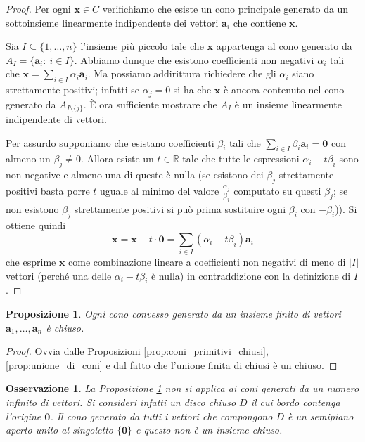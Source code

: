 \documentclass[italian, 12pt, reqno]{article}
\theoremstyle{myteo}
\newtheorem{proposition}[theorem]{Proposizione}
\newtheorem{remark}[theorem]{Osservazione}
\numberwithin{equation}{section}
\begin{document}
\begin{proof}
  Per ogni \(\mathbf{x}\in C\) verifichiamo che esiste un cono principale generato da un sottoinsieme linearmente indipendente dei vettori \(\mathbf{a}_i\) che contiene \(\mathbf{x}\).

  Sia \(I\subseteq\{1,\ldots, n\}\) l'insieme più piccolo tale che \(\mathbf{x}\) appartenga al cono generato da \(A_I=\{\mathbf{a}_i\colon\ i\in I\}\).
  Abbiamo dunque che esistono coefficienti non negativi \(\alpha_i\) tali che \(\mathbf{x} = \sum_{i\in I}\alpha_i \mathbf{a}_i\).
  Ma possiamo addirittura richiedere che gli \(\alpha_i\) siano strettamente positivi; infatti se \(\alpha_j = 0\) si ha che \(\mathbf{x}\) è ancora contenuto nel cono generato da \(A_{I\setminus\{j\}}\).
  È ora sufficiente mostrare che \(A_I\) è un insieme linearmente indipendente di vettori.

  Per assurdo supponiamo che esistano coefficienti \(\beta_i\) tali che \(\sum_{i\in I}\beta_i \mathbf{a}_i=\mathbf{0}\) con almeno un \(\beta_j\neq0\).
  Allora esiste un \(t\in \mathbb{R}\) tale che tutte le espressioni \(\alpha_i - t\beta_i\) sono non negative e almeno una di queste è nulla (se esistono dei \(\beta_j\) strettamente positivi basta porre \(t\) uguale al minimo del valore \(\frac{\alpha_j}{\beta_j}\) computato su questi \(\beta_j\); se non esistono \(\beta_j\) strettamente positivi si può prima sostituire ogni \(\beta_i\) con \(-\beta_i\))).
  Si ottiene quindi  
  \begin{equation*}
    \mathbf{x} = \mathbf{x} - t\cdot\mathbf{0} = \sum_{i\in I}(\alpha_i - t\beta_i)\mathbf{a}_i
  \end{equation*}
  che esprime \(\mathbf{x}\) come combinazione lineare a coefficienti non negativi di meno di \(|I|\) vettori (perché una delle \(\alpha_i - t\beta_i\) è nulla) in contraddizione con la definizione di \(I\).
\end{proof}

\begin{proposition}
  \label{prop:coni_chiusi}
  Ogni cono convesso generato da un insieme finito di vettori \(\mathbf{a}_1,\ldots,\mathbf{a}_n\) è chiuso.
\end{proposition}

\begin{proof}
  Ovvia dalle Proposizioni \ref{prop:coni_primitivi_chiusi}, \ref{prop:unione_di_coni} e dal fatto che l'unione finita di chiusi è un chiuso.
\end{proof}

\begin{remark}
  \label{oss:numero_finito}
  La Proposizione \ref{prop:coni_chiusi} non si applica ai coni generati da un numero infinito di vettori.
  Si consideri infatti un disco chiuso \(D\) il cui bordo contenga l'origine \(\mathbf{0}\).
  Il cono generato da tutti i vettori che compongono \(D\) è un semipiano aperto unito al singoletto \(\{\mathbf{0}\}\) e questo non è un insieme chiuso.
\end{remark}
\end{document}
